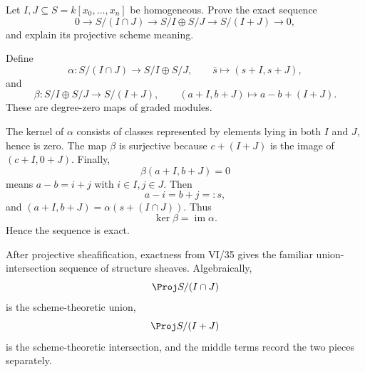 \begin{problem}\label{prob:vi37-13}
Let \(I,J\subseteq S=k[x_0,\ldots,x_n]\) be homogeneous. Prove the exact sequence
\[
0\to S/(I\cap J)\longrightarrow S/I\oplus S/J\longrightarrow S/(I+J)\to0,
\]
and explain its projective scheme meaning.

\end{problem}

\ifdefined\FullProblemDossiers
\begin{solution}
Define
\[
\alpha:S/(I\cap J)\longrightarrow S/I\oplus S/J,
\qquad
\bar s\longmapsto(s+I,s+J),
\]
and
\[
\beta:S/I\oplus S/J\longrightarrow S/(I+J),
\qquad
(a+I,b+J)\longmapsto a-b+(I+J).
\]
These are degree-zero maps of graded modules.

The kernel of \(\alpha\) consists of classes represented by elements lying in both \(I\) and \(J\), hence is zero.
The map \(\beta\) is surjective because \(c+(I+J)\) is the image of \((c+I,0+J)\).
Finally,
\[
\beta(a+I,b+J)=0
\]
means \(a-b=i+j\) with \(i\in I,j\in J\). Then
\[
a-i=b+j=:s,
\]
and \((a+I,b+J)=\alpha(s+(I\cap J))\). Thus
\[
\ker\beta=\operatorname{im}\alpha.
\]
Hence the sequence is exact.

After projective sheafification, exactness from VI/35 gives the familiar union-intersection sequence of structure sheaves. Algebraically,
\[
\Proj S/(I\cap J)
\]
is the scheme-theoretic union,
\[
\Proj S/(I+J)
\]
is the scheme-theoretic intersection, and the middle terms record the two pieces separately.
\end{solution}
\fi
